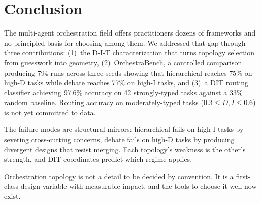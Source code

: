 \section{Conclusion}

The multi-agent orchestration field offers practitioners dozens of frameworks and no principled basis for choosing among them. We addressed that gap through three contributions: (1)~the D-I-T characterization that turns topology selection from guesswork into geometry, (2)~OrchestraBench, a controlled comparison producing 794 runs across three seeds showing that hierarchical reaches 75\% on high-D tasks while debate reaches 77\% on high-I tasks, and (3)~a DIT routing classifier achieving 97.6\% accuracy on 42 strongly-typed tasks against a 33\% random baseline. Routing accuracy on moderately-typed tasks ($0.3 \leq D, I \leq 0.6$) is not yet committed to data.

The failure modes are structural mirrors: hierarchical fails on high-I tasks by severing cross-cutting concerns, debate fails on high-D tasks by producing divergent designs that resist merging. Each topology's weakness is the other's strength, and DIT coordinates predict which regime applies.

Orchestration topology is not a detail to be decided by convention. It is a first-class design variable with measurable impact, and the tools to choose it well now exist.
